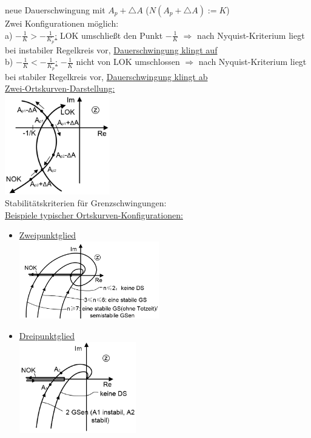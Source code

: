 \documentclass[openany,a4paper,11pt]{book}
\begin{document}
neue Dauerschwingung mit $A_p+\triangle A$ ($N(A_p+\triangle A):=K$)\\
Zwei Konfigurationen möglich:\\
a) \uline{$-\frac{1}{K}>-\frac{1}{K_p}$:} LOK umschließt den Punkt $-\frac{1}{K}$ $\Rightarrow$ nach Nyquist-Kriterium liegt bei instabiler Regelkreis vor, \uline{Dauerschwingung klingt auf}\\
b) \uline{$-\frac{1}{K}<-\frac{1}{K_p}$:} $-\frac{1}{K}$ nicht von LOK umschlossen $\Rightarrow$ nach Nyquist-Kriterium liegt bei stabiler Regelkreis vor, \uline{Dauerschwingung klingt ab}\\
\uline{Zwei-Ortskurven-Darstellung:}\\
\includegraphics[width=1.8in]{imgs/NLR60.png}\\
Stabilitätskriterien für Grenzschwingungen:  \\ 
\uline{Beispiele typischer Ortskurven-Konfigurationen:}
\begin{itemize}
    \item \uline{Zweipunktglied}\\
    \includegraphics[width=2.4in]{imgs/NLR61.png}
    \item \uline{Dreipunktglied}\\
    \includegraphics[width=2in]{imgs/NLR62.png}
\end{itemize}
\end{document}
